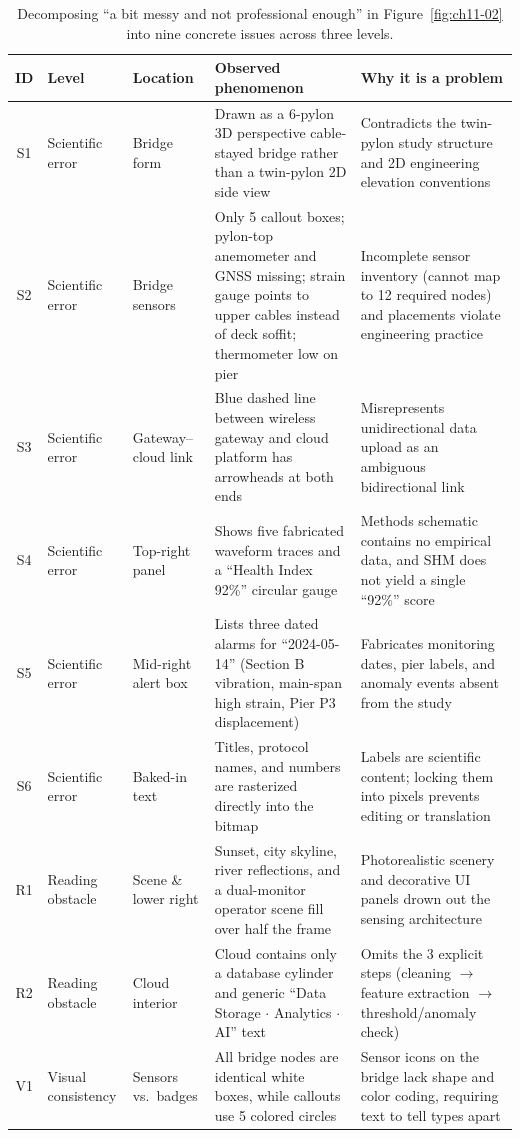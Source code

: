 \begin{table}[htbp]\centering\scriptsize
\setlength{\tabcolsep}{3pt}
\renewcommand{\arraystretch}{1.08}
\caption{Decomposing ``a bit messy and not professional enough'' in Figure~\ref{fig:ch11-02} into nine concrete issues across three levels.}\label{tab:ch11-01}
\begin{tabularx}{\linewidth}{@{}c>{\raggedright\arraybackslash}p{16mm}>{\raggedright\arraybackslash}p{21mm}YY@{}}
\toprule
\textbf{ID} & \textbf{Level} & \textbf{Location} & \textbf{Observed phenomenon} & \textbf{Why it is a problem} \\
\midrule
S1 & Scientific error & Bridge form & Drawn as a 6-pylon 3D perspective cable-stayed bridge rather than a twin-pylon 2D side view & Contradicts the twin-pylon study structure and 2D engineering elevation conventions \\
S2 & Scientific error & Bridge sensors & Only 5 callout boxes; pylon-top anemometer and GNSS missing; strain gauge points to upper cables instead of deck soffit; thermometer low on pier & Incomplete sensor inventory (cannot map to 12 required nodes) and placements violate engineering practice \\
S3 & Scientific error & Gateway--cloud link & Blue dashed line between wireless gateway and cloud platform has arrowheads at both ends & Misrepresents unidirectional data upload as an ambiguous bidirectional link \\
S4 & Scientific error & Top-right panel & Shows five fabricated waveform traces and a ``Health Index 92\%'' circular gauge & Methods schematic contains no empirical data, and SHM does not yield a single ``92\%'' score \\
S5 & Scientific error & Mid-right alert box & Lists three dated alarms for ``2024-05-14'' (Section B vibration, main-span high strain, Pier P3 displacement) & Fabricates monitoring dates, pier labels, and anomaly events absent from the study \\
S6 & Scientific error & Baked-in text & Titles, protocol names, and numbers are rasterized directly into the bitmap & Labels are scientific content; locking them into pixels prevents editing or translation \\
R1 & Reading obstacle & Scene \& lower right & Sunset, city skyline, river reflections, and a dual-monitor operator scene fill over half the frame & Photorealistic scenery and decorative UI panels drown out the sensing architecture \\
R2 & Reading obstacle & Cloud interior & Cloud contains only a database cylinder and generic ``Data Storage $\cdot$ Analytics $\cdot$ AI'' text & Omits the 3 explicit steps (cleaning $\rightarrow$ feature extraction $\rightarrow$ threshold/anomaly check) \\
V1 & Visual consistency & Sensors vs.\ badges & All bridge nodes are identical white boxes, while callouts use 5 colored circles & Sensor icons on the bridge lack shape and color coding, requiring text to tell types apart \\
\bottomrule
\end{tabularx}
\end{table}

